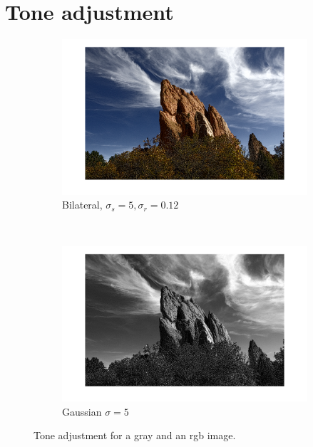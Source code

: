 \documentclass[a4spaper]{article}
\begin{document}
\section*{Tone adjustment}
\begin{figure}[ht]
	\centering
	\begin{subfigure}[h]{0.48\textwidth}
		\centering
		\includegraphics[width=\textwidth]{toneAdjust1}
		\caption*{Bilateral, $\sigma_s = 5, \sigma_r = 0.12$}
	\end{subfigure}
	~ 
	\begin{subfigure}[h]{0.48\textwidth}
		\centering
		\includegraphics[width=\textwidth]{toneAdjust2}
		\caption*{Gaussian $\sigma = 5$}
	\end{subfigure}	

\caption{Tone adjustment for a gray and an rgb image.}
\label{fig:tonemap-gauss-bilateral}
\end{figure}
\end{document}
